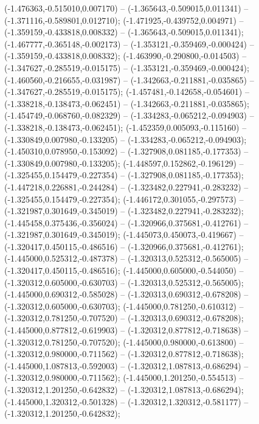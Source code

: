  (-1.476363,-0.515010,0.007170) -- (-1.365643,-0.509015,0.011341) -- (-1.371116,-0.589801,0.012710);
 (-1.471925,-0.439752,0.004971) -- (-1.359159,-0.433818,0.008332) -- (-1.365643,-0.509015,0.011341);
 (-1.467777,-0.365148,-0.002173) -- (-1.353121,-0.359469,-0.000424) -- (-1.359159,-0.433818,0.008332);
 (-1.463990,-0.290800,-0.014503) -- (-1.347627,-0.285519,-0.015175) -- (-1.353121,-0.359469,-0.000424);
 (-1.460560,-0.216655,-0.031987) -- (-1.342663,-0.211881,-0.035865) -- (-1.347627,-0.285519,-0.015175);
 (-1.457481,-0.142658,-0.054601) -- (-1.338218,-0.138473,-0.062451) -- (-1.342663,-0.211881,-0.035865);
 (-1.454749,-0.068760,-0.082329) -- (-1.334283,-0.065212,-0.094903) -- (-1.338218,-0.138473,-0.062451);
 (-1.452359,0.005093,-0.115160) -- (-1.330849,0.007980,-0.133205) -- (-1.334283,-0.065212,-0.094903);
 (-1.450310,0.078950,-0.153092) -- (-1.327908,0.081185,-0.177353) -- (-1.330849,0.007980,-0.133205);
 (-1.448597,0.152862,-0.196129) -- (-1.325455,0.154479,-0.227354) -- (-1.327908,0.081185,-0.177353);
 (-1.447218,0.226881,-0.244284) -- (-1.323482,0.227941,-0.283232) -- (-1.325455,0.154479,-0.227354);
 (-1.446172,0.301055,-0.297573) -- (-1.321987,0.301649,-0.345019) -- (-1.323482,0.227941,-0.283232);
 (-1.445458,0.375436,-0.356024) -- (-1.320966,0.375681,-0.412761) -- (-1.321987,0.301649,-0.345019);
 (-1.445073,0.450073,-0.419667) -- (-1.320417,0.450115,-0.486516) -- (-1.320966,0.375681,-0.412761);
 (-1.445000,0.525312,-0.487378) -- (-1.320313,0.525312,-0.565005) -- (-1.320417,0.450115,-0.486516);
 (-1.445000,0.605000,-0.544050) -- (-1.320312,0.605000,-0.630703) -- (-1.320313,0.525312,-0.565005);
 (-1.445000,0.690312,-0.585028) -- (-1.320313,0.690312,-0.678208) -- (-1.320312,0.605000,-0.630703);
 (-1.445000,0.781250,-0.610312) -- (-1.320312,0.781250,-0.707520) -- (-1.320313,0.690312,-0.678208);
 (-1.445000,0.877812,-0.619903) -- (-1.320312,0.877812,-0.718638) -- (-1.320312,0.781250,-0.707520);
 (-1.445000,0.980000,-0.613800) -- (-1.320312,0.980000,-0.711562) -- (-1.320312,0.877812,-0.718638);
 (-1.445000,1.087813,-0.592003) -- (-1.320312,1.087813,-0.686294) -- (-1.320312,0.980000,-0.711562);
 (-1.445000,1.201250,-0.554513) -- (-1.320312,1.201250,-0.642832) -- (-1.320312,1.087813,-0.686294);
 (-1.445000,1.320312,-0.501328) -- (-1.320312,1.320312,-0.581177) -- (-1.320312,1.201250,-0.642832);
